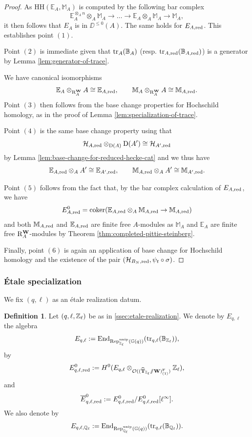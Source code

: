 \documentclass[a4paper, 10pt, oneside, reqno]{amsart}
\theoremstyle{plain}
\theoremstyle{definition}
\newtheorem{defi}[thm]{Definition}
\theoremstyle{remark}
\newcommand{\Gbb}{\mathbb{G}}
\newcommand{\RR}{\mathrm{R}}
\newcommand{\HHH}{\mathrm{HH}}
\newcommand{\EE}{\mathbb{E}}
\newcommand{\Mbb}{\mathbb{M}}
\begin{document}
\begin{proof}
As $\HHH(\EE_A, \Mbb_A)$ is computed by the following bar complex 
$$ \EE_A^{\otimes_A n} \otimes_A \Mbb_A \to \dots \to \EE_A \otimes_A \Mbb_A \to \Mbb_A,$$
it then follows that $E_A$ is in $\DD^{\leq 0}(A)$. The same holds for $E_{A,\mathrm{red}}$. This establishes point $(1)$. 

Point $(2)$ is immediate given that $\mathrm{tr}_A(\mathbb{B}_A)$ (resp. $\mathrm{tr}_{A, \mathrm{red}}(\mathbb{B}_{A, \mathrm{red}})$) is a generator by Lemma \ref{lem:generator-of-trace}.

We have canonical isomorphisms
$$\EE_A \otimes_{\RR_A^{\Wbf}} A \cong \EE_{A, \red}, \qquad \Mbb_A \otimes_{\RR_A^{\Wbf}} A \cong \Mbb_{A, \red}.$$
Point $(3)$ then follows from the base change properties for Hochschild homology, as in the proof of Lemma \ref{lem:specialization-of-trace}.

Point $(4)$ is the same base change property using that 
$$\mathcal{H}_{A, \mathrm{red}} \otimes_{\mathrm{D}(A)} \mathrm{D}(A') \cong \mathcal{H}_{A', \mathrm{red}}$$
by Lemma \ref{lem:base-change-for-reduced-hecke-cat} and we thus have
$$\EE_{A, \red} \otimes_A A' \cong \EE_{A', \red}, \qquad \Mbb_{A,\red} \otimes_A A' \cong \Mbb_{A',\red}.$$

Point $(5)$ follows from the fact that, by the bar complex calculation of $E_{A,\mathrm{red}}$, we have 
$$E^0_{A,\red} = \coker(\EE_{A,\red} \otimes_A \Mbb_{A,\red} \to \Mbb_{A,\red})$$
and both $\Mbb_{A,\red}$ and $\EE_{A,\red}$ are finite free $A$-modules as $\Mbb_A$ and $\EE_A$ are finite free $\RR_A^{\Wbf}$-modules by Theorem \ref{thm:completed-pittie-steinberg}. 

Finally, point $(6)$ is again an application of base change for Hochschild homology and the existence of the pair $(\mathcal{H}_{B_N, \mathrm{red}}, \psi_t \circ \sigma)$. 
\end{proof}

\subsubsection{\'{E}tale specialization}

We fix $(q, \ell)$ as an étale realization datum. 

\begin{defi}
Let $(q,\ell, \mathbb{Z}_{\ell})$ be as in \ref{ssec:etale-realization}. We denote by $E_{q,\ell}$ the algebra 
$$E_{q,\ell} := \End_{\Rep_{\Zl}^{\unip}(\Gbb(q))}(\tr_{q,\ell}(\mathbb{B}_{\Zl})),$$
by 
$$E_{q, \ell, \mathrm{red}}^0 := H^0(E_{q,\ell} \otimes_{\mathcal{O}((\widehat{\mathbf{T}}_{\mathbb{Z}_{\ell}}\sslash \mathbf{W})^{\mathrm{F}}_{(1)})} \mathbb{Z}_{\ell}),$$
and 
$$\overline{E}^0_{q,\ell, \mathrm{red}} := E^0_{q,\ell, \mathrm{red}}/E_{q,\ell, \mathrm{red}}^0[\ell^{\infty}].$$
We also denote by 
$$E_{q, \ell, \Ql} := \End_{\Rep_{\Ql}^{\unip}(\Gbb(q))}(\tr_{q,\ell}(\mathbb{B}_{\Ql})).$$
\end{defi}
\end{document}
